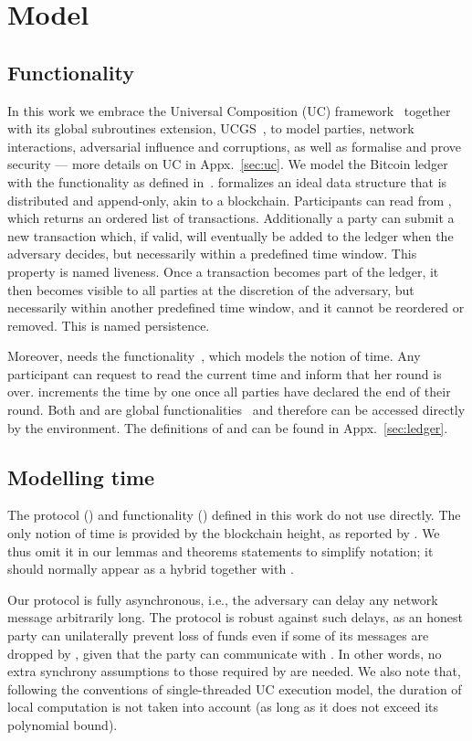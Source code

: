 \section{Model}

  \subsection{\ledger Functionality}
  In this work we embrace the Universal Composition (UC) framework~\cite{uc}
  together with its global subroutines extension,
  UCGS~\cite{DBLP:conf/tcc/BadertscherCHTZ20}, to
  model parties, network interactions, adversarial influence and corruptions, as
  well as formalise and prove security --- more details on UC in
  Appx.~\ref{sec:uc}. We model the Bitcoin ledger with the \ledger
  functionality as defined in~\cite{BMTZ17,genesis}. \ledger formalizes an ideal
  data structure that is
  distributed and append-only, akin to a blockchain. Participants can read from
  \ledger, which returns an ordered list of transactions. Additionally a party
  can submit a new transaction which, if valid, will eventually be added to the
  ledger when the adversary decides, but necessarily within a predefined time
  window. This property is named liveness. Once a transaction becomes part of
  the ledger, it then becomes visible to all parties at the discretion of the
  adversary, but necessarily within another predefined time window, and it
  cannot be reordered or removed. This is named persistence.

  Moreover, \ledger needs the \Fclock
  functionality~\cite{DBLP:conf/tcc/KatzMTZ13}, which models the notion of time.
  Any \Fclock participant can request to read the current time and inform \Fclock that her round is over. \Fclock increments the
  time by one once all parties have declared the end of their round. Both
  \ledger and \Fclock are global
  functionalities~\cite{DBLP:conf/tcc/BadertscherCHTZ20} and therefore can be
  accessed directly by the environment. The definitions of \ledger and \Fclock
  can be found in Appx.~\ref{sec:ledger}.

  \subsection{Modelling time}
  The protocol (\pchan) and functionality (\fchan) defined in this work do not use \Fclock
  directly. The only notion of time is provided by the
  blockchain height, as reported by \ledger. We thus omit it in
  our lemmas and theorems statements to simplify notation; it should
  normally appear as a hybrid together with \ledger.

  Our protocol is fully asynchronous, i.e., the adversary can delay any network
  message arbitrarily long. The protocol is robust against such delays, as an
  honest party can unilaterally prevent loss of funds even if some of its
  messages are dropped by \adversary, given that
  the party can communicate with \ledger. In other words, no
  extra synchrony assumptions to those required by \ledger are needed. We
  also note that,
  following the conventions of single-threaded UC execution model, the duration of local
  computation is not taken into account (as long as it does not
  exceed its polynomial bound).
